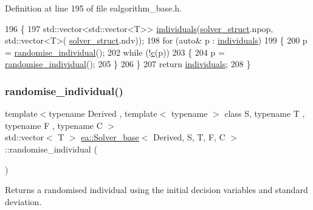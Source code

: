 Definition at line 195 of file ealgorithm\+\_\+base.\+h.


\begin{DoxyCode}
196     \{
197         std::vector<std::vector<T>> \hyperlink{classea_1_1_solver__base_ad75bc440d24a46e97694c7c889f2ecde}{individuals}(\hyperlink{classea_1_1_solver__base_a5e1d821809f2d26c6f882942ad728127}{solver\_struct}.npop, std::vector<T>(
      \hyperlink{classea_1_1_solver__base_a5e1d821809f2d26c6f882942ad728127}{solver\_struct}.ndv));
198         \textcolor{keywordflow}{for} (\textcolor{keyword}{auto}& p : \hyperlink{classea_1_1_solver__base_ad75bc440d24a46e97694c7c889f2ecde}{individuals})
199         \{
200             p = \hyperlink{classea_1_1_solver__base_a865cea7e218b633b440b88fa09e48466}{randomise\_individual}();
202             \textcolor{keywordflow}{while} (!\hyperlink{classea_1_1_solver__base_a6914e89d30e7484f2b4af1783f0de8c3}{c}(p))
203             \{
204                 p = \hyperlink{classea_1_1_solver__base_a865cea7e218b633b440b88fa09e48466}{randomise\_individual}();
205             \}
206         \}
207         \textcolor{keywordflow}{return} \hyperlink{classea_1_1_solver__base_ad75bc440d24a46e97694c7c889f2ecde}{individuals};
208     \}
\end{DoxyCode}
\mbox{\label{classea_1_1_solver__base_a865cea7e218b633b440b88fa09e48466}} 
\subsubsection{\texorpdfstring{randomise\+\_\+individual()}{randomise\_individual()}}
{\footnotesize\ttfamily template$<$typename Derived , template$<$ typename $>$ class S, typename T , typename F , typename C $>$ \\
std\+::vector$<$ T $>$ \hyperlink{classea_1_1_solver__base}{ea\+::\+Solver\+\_\+base}$<$ Derived, S, T, F, C $>$\+::randomise\+\_\+individual (\begin{DoxyParamCaption}{ }\end{DoxyParamCaption})\hspace{0.3cm}{\ttfamily [protected]}}



Returns a randomised individual using the initial decision variables and standard deviation. 

